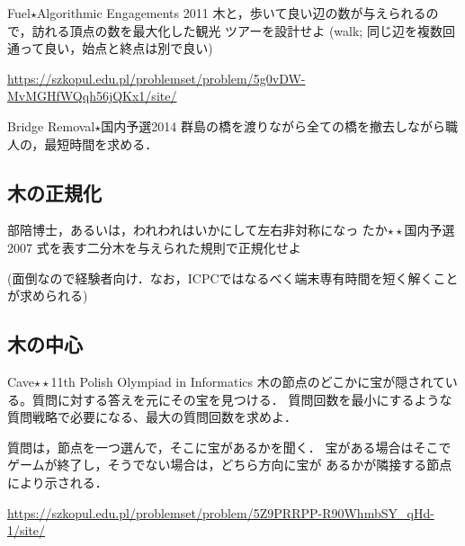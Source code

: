 \begin{pbox}{Fuel$\star$}{Algorithmic Engagements 2011}
木と，歩いて良い辺の数が与えられるので，訪れる頂点の数を最大化した観光
ツアーを設計せよ (walk; 同じ辺を複数回通って良い，始点と終点は別で良い)

\url{https://szkopul.edu.pl/problemset/problem/5g0vDW-MvMGHfWQqh56jQKx1/site/}
\end{pbox}

\begin{pbox}{Bridge Removal$\star$}{国内予選2014}
群島の橋を渡りながら全ての橋を撤去しながら職人の，最短時間を求める．

\end{pbox}

\subsection{木の正規化}

\begin{pbox}{部陪博士，{\scriptsize あるいは，われわれはいかにして左右非対称になっ
    たか}$\star\star$}{国内予選 2007}
式を表す二分木を与えられた規則で正規化せよ

\end{pbox}

(面倒なので経験者向け．なお，ICPCではなるべく端末専有時間を短く解くことが求められる)


\subsection{木の中心}

\begin{pbox}{Cave$\star\star$}{11th Polish Olympiad in Informatics}
木の節点のどこかに宝が隠されている。質問に対する答えを元にその宝を見つける．
質問回数を最小にするような質問戦略で必要になる、最大の質問回数を求めよ．

質問は，節点を一つ選んで，そこに宝があるかを聞く．
宝がある場合はそこでゲームが終了し，そうでない場合は，どちら方向に宝が
あるかが隣接する節点により示される．

\url{https://szkopul.edu.pl/problemset/problem/5Z9PRRPP-R90WhmbSY_qHd-1/site/}
\end{pbox}


